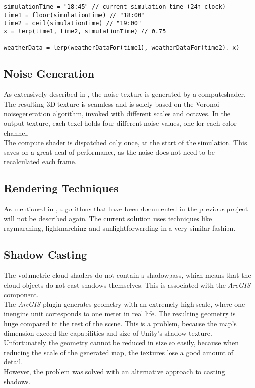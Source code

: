 \begin{lstlisting}[language=HLSL, caption=Pseudo-code for linear interpolation of weather data., label=lst:psuedo:weather:lerp]
simulationTime = "18:45" // current simulation time (24h-clock)
time1 = floor(simulationTime) // "18:00"
time2 = ceil(simulationTime) // "19:00"
x = lerp(time1, time2, simulationTime) // 0.75

weatherData = lerp(weatherDataFor(time1), weatherDataFor(time2), x)
\end{lstlisting}

\clearpage

\subsection{Noise Generation}
\label{section:techimpl:noise}
As extensively described in , the \gls{noise} texture is generated by a \gls{computeshader}.
The resulting 3D texture is seamless and is solely based on the Voronoi \gls{noisegeneration} algorithm, invoked with different scales and octaves.
In the output texture, each \gls{texel} holds four different \gls{noise} values, one for each color channel.
\\
The compute shader is dispatched only once, at the start of the simulation.
This saves on a great deal of performance, as the \gls{noise} does not need to be recalculated each frame.

\subsection{Rendering Techniques}
As mentioned in , algorithms that have been documented in the previous project will not be described again.
The current solution uses techniques like \gls{raymarching}, \gls{lightmarching} and \gls{sunlightforwarding} in a very similar fashion.

\subsection{Shadow Casting}
\label{section:techimpl:shadow}
The \gls{volumetric} cloud \gls{shader}s do not contain a \gls{shadowpass}, which means that the cloud objects do not cast shadows themselves.
This is associated with the \emph{ArcGIS}  component.
\\
The \emph{ArcGIS} plugin generates geometry with an extremely high scale, where one \gls{inengine} unit corresponds to one meter in real life.
The resulting geometry is huge compared to the rest of the scene. This is a problem, because the map's dimension exceed the capabilities and size of Unity's shadow texture.
Unfortunately the geometry cannot be reduced in size so easily, because when reducing the scale of the generated map, the textures lose a good amount of detail.
\\
However, the problem was solved with an alternative approach to casting shadows.

